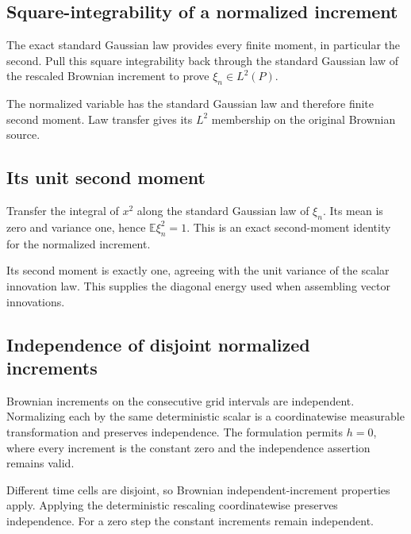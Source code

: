 \documentclass[11pt,a4paper]{article}
\begin{document}
\subsection{\texorpdfstring{Square-integrability of a normalized increment}{Square-integrability of a normalized increment}}


The exact standard Gaussian law provides every finite moment, in particular the second. Pull this square integrability back through the standard Gaussian law of the rescaled Brownian increment to prove \(\xi_n\in L^2(P)\).



The normalized variable has the standard Gaussian law and therefore finite second moment. Law transfer gives its \(L^2\) membership on the original Brownian source.


\subsection{\texorpdfstring{Its unit second moment}{Its unit second moment}}


Transfer the integral of \(x^2\) along the standard Gaussian law of \(\xi_n\). Its mean is zero and variance one, hence \(\mathbb E\xi_n^2=1\). This is an exact second-moment identity for the normalized increment.



Its second moment is exactly one, agreeing with the unit variance of the scalar innovation law. This supplies the diagonal energy used when assembling vector innovations.


\subsection{\texorpdfstring{Independence of disjoint normalized increments}{Independence of disjoint normalized increments}}


Brownian increments on the consecutive grid intervals are independent. Normalizing each by the same deterministic scalar is a coordinatewise measurable transformation and preserves independence. The formulation permits \(h=0\), where every increment is the constant zero and the independence assertion remains valid.



Different time cells are disjoint, so Brownian independent-increment properties apply. Applying the deterministic rescaling coordinatewise preserves independence. For a zero step the constant increments remain independent.
\end{document}
